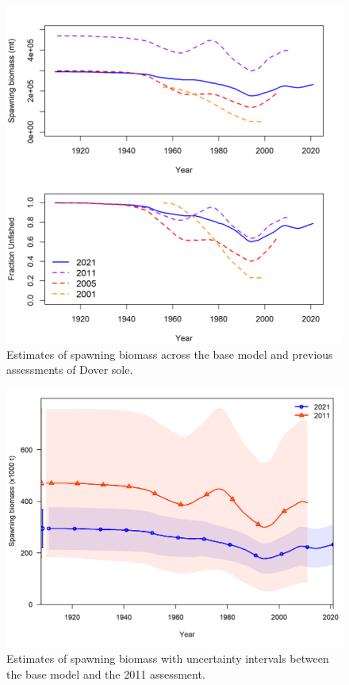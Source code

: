 \documentclass[11pt,
  english,
  a4paper,
]{article}
\begin{document}
\begin{figure}
\centering
\includegraphics[width=1\textwidth,height=1\textheight]{figs/assessment_history.png}
\caption{Estimates of spawning biomass across the base model and previous assessments of Dover sole.\label{fig:past-assess}}
\end{figure}

\tagmcend\tagstructend


\begin{figure}
\centering
\includegraphics[width=1\textwidth,height=1\textheight]{figs/2021_2011_compare2_spawnbio_uncertainty.png}
\caption{Estimates of spawning biomass with uncertainty intervals between the base model and the 2011 assessment.\label{fig:ssb-2011-2021}}
\end{figure}
\end{document}
